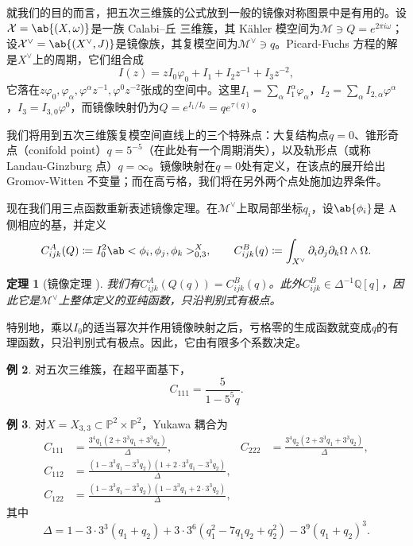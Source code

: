 \documentclass{amsart}
\newtheorem{thm}{定理}[section]
\theoremstyle{definition}
\newtheorem{exm}[thm]{例}
\theoremstyle{remark}
\theoremstyle{plain}
\theoremstyle{definition}
\theoremstyle{remark}
\newcommand{\Q}{\mathbb{Q}}
\renewcommand{\P}{\mathbb{P}}
\newcommand{\mc}[1]{\mathcal{#1}}
\newcommand{\1}{\mathbf{1}}
\newcommand{\2}{\mathbf{2}}
\newcommand{\3}{\mathbf{3}}
\begin{document}
就我们的目的而言，把五次三维簇的公式放到一般的镜像对称图景中是有用的。设\(\mc{X} = \ab\{(X,\omega)\}\)是一族 Calabi--丘 三维簇，其 Kähler 模空间为\(\mc{M} \ni Q = e^{2\pi i \omega}\)；设\(\mc{X}^{\vee} = \ab\{(X^{\vee},J)\}\)是镜像族，其复模空间为\(\mc{M}^{\vee} \ni q\)。Picard-Fuchs 方程的解是\(X^{\vee}\)上的周期，它们组合成
\[ I(z) = zI_0\varphi_0 + I_1 + I_2 z^{-1} + I_3 z^{-2}, \]
它落在\(z\varphi_0, \varphi_{\alpha}, \varphi^{\alpha}z^{-1}, \varphi^0 z^{-2}\)张成的空间中。这里\(I_1 = \sum_{\alpha} I_1^{\alpha}\varphi_{\alpha}\)，\(I_2 = \sum_{\alpha} I_{2,\alpha}\varphi^{\alpha}\)，\(I_3 = I_{3,0}\varphi^0\)，而镜像映射仍为\(Q = e^{I_1/I_0} = qe^{\tau(q)}\)。

我们将用到五次三维簇复模空间直线上的三个特殊点：大复结构点\(q=0\)、锥形奇点（conifold point）\(q = 5^{-5}\)（在此处有一个周期消失），以及轨形点（或称 Landau-Ginzburg 点）\(q = \infty\)。镜像映射在\(q=0\)处有定义，在该点的展开给出 Gromov-Witten 不变量；而在高亏格，我们将在另外两个点处施加边界条件。

现在我们用三点函数重新表述镜像定理。在\(\mc{M}^{\vee}\)上取局部坐标\(q_i\)，设\(\ab\{\phi_i\}\)是 A 侧相应的基，并定义
\[ C^A_{ijk}(Q) \coloneqq I_0^2 \ab<\phi_i, \phi_j, \phi_k>^X_{0,3}, \qquad C^B_{ijk}(q) \coloneqq \int_{X^{\vee}} \partial_i \partial_j \partial_k \Omega \wedge \Omega. \]

\begin{thm}[镜像定理 {\cite{Givental1998,LLY1997}}]
    我们有\(C^A_{ijk}(Q(q)) = C^B_{ijk}(q)\)。此外\(C^B_{ijk} \in \Delta^{-1}\Q[q]\)，因此它是\(\mc{M}^{\vee}\)上整体定义的亚纯函数，只沿判别式有极点。
\end{thm}

特别地，乘以\(I_0\)的适当幂次并作用镜像映射之后，亏格零的生成函数就变成\(q\)的有理函数，只沿判别式有极点。因此，它由有限多个系数决定。

\begin{exm}
    对五次三维簇，在超平面基下，
    \[ C_{111} = \frac{5}{1-5^5 q}. \]
\end{exm}

\begin{exm}
    对\(X = X_{3,3} \subset \P^2 \times \P^2\)，Yukawa 耦合为
    \begin{align*}
        C_{111} &= \frac{3^4 q_1 (2+3^3q_1+3^3q_2)}{\Delta}, & C_{222} &= \frac{3^4 q_2(2+3^3q_1+3^3q_2)}{\Delta}, \\
        C_{112} &= \frac{(1-3^3q_1-3^3q_2)(1+2\cdot 3^3 q_1 - 3^3 q_2)}{\Delta}, \\
        C_{122} &= \frac{(1-3^3q_1-3^3q_2)(1-3^3q_1+2\cdot3^3q_2)}{\Delta},
    \end{align*}
    其中
    \[ \Delta = 1 - 3\cdot3^3(q_1+q_2) + 3\cdot3^6(q_1^2 - 7q_1q_2+q_2^2) - 3^9(q_1+q_2)^3. \]
\end{exm}
\end{document}
